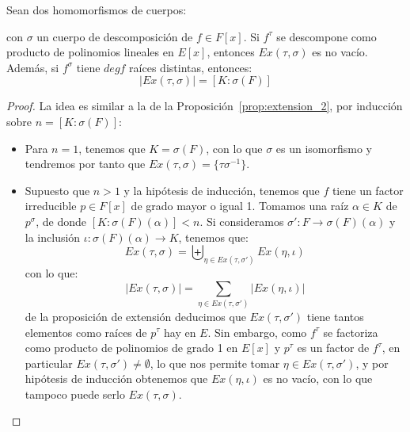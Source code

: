 \begin{prop}\label{prop:extension_3}
    Sean dos homomorfismos de cuerpos:
    \begin{figure}[H]
        \centering
    \end{figure}
    \noindent
    con $\sigma$ un cuerpo de descomposición de $f\in F[x]$. Si $f^\tau$ se descompone como producto de polinomios lineales en $E[x]$, entonces $Ex(\tau,\sigma)$ es no vacío. Además, si $f^\sigma$ tiene $deg f$ raíces distintas, entonces:
    \begin{equation*}
        |Ex(\tau, \sigma)| = [K:\sigma(F)]
    \end{equation*}
    \begin{proof}
        La idea es similar a la de la Proposición~\ref{prop:extension_2}, por inducción sobre $n=[K:\sigma(F)]$:
        \begin{itemize}
            \item Para $n = 1$, tenemos que $K = \sigma(F)$, con lo que $\sigma$ es un isomorfismo y tendremos por tanto que $Ex(\tau,\sigma) = \{\tau\sigma^{-1}\}$.
            \item Supuesto que $n>1$ y la hipótesis de inducción, tenemos que $f$ tiene un factor irreducible $p\in F[x]$ de grado mayor o igual 1. Tomamos una raíz $\alpha\in K$ de $p^\sigma$, de donde $[K:\sigma(F)(\alpha)]<n$. Si consideramos $\sigma':F\to \sigma(F)(\alpha)$ y la inclusión $\iota:\sigma(F)(\alpha)\to K$, tenemos que:
                \begin{equation*}
                    Ex(\tau,\sigma) = \biguplus_{\eta\in Ex(\tau,\sigma')}Ex(\eta,\iota)
                \end{equation*}
                con lo que:
                \begin{equation*}
                    |Ex(\tau,\sigma)| = \sum_{\eta \in  Ex(\tau, \sigma')}|Ex(\eta,\iota)|
                \end{equation*}
                de la proposición de extensión deducimos que $Ex(\tau,\sigma')$ tiene tantos elementos como raíces de $p^\tau$ hay en $E$. Sin embargo, como $f^\tau$ se factoriza como producto de polinomios de grado 1 en $E[x]$ y $p^\tau$ es un factor de $f^\tau$, en particular $Ex(\tau,\sigma')\neq \emptyset $, lo que nos permite tomar $\eta \in Ex(\tau,\sigma')$, y por hipótesis de inducción obtenemos que $Ex(\eta, \iota)$ es no vacío, con lo que tampoco puede serlo $Ex(\tau,\sigma)$.


\end{itemize}
\end{proof}
\end{prop}

